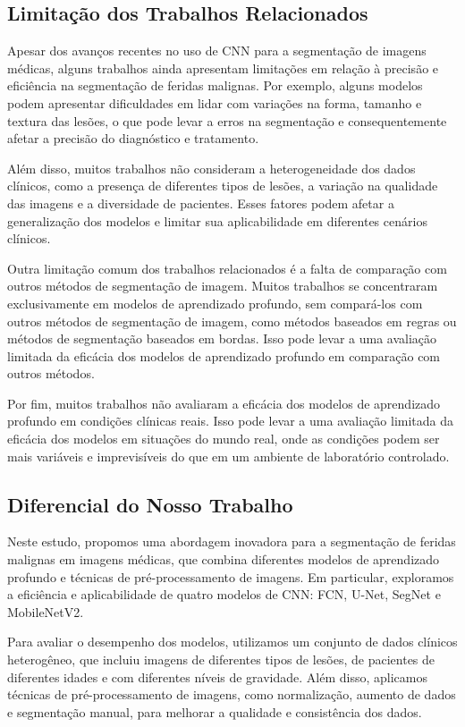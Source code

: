 \subsection{Limitação dos Trabalhos Relacionados}

Apesar dos avanços recentes no uso de \ac{CNN} para a segmentação de imagens médicas, alguns trabalhos ainda apresentam limitações em relação à precisão e eficiência na segmentação de feridas malignas. Por exemplo, alguns modelos podem apresentar dificuldades em lidar com variações na forma, tamanho e textura das lesões, o que pode levar a erros na segmentação e consequentemente afetar a precisão do diagnóstico e tratamento.

Além disso, muitos trabalhos não consideram a heterogeneidade dos dados clínicos, como a presença de diferentes tipos de lesões, a variação na qualidade das imagens e a diversidade de pacientes. Esses fatores podem afetar a generalização dos modelos e limitar sua aplicabilidade em diferentes cenários clínicos.

Outra limitação comum dos trabalhos relacionados é a falta de comparação com outros métodos de segmentação de imagem. Muitos trabalhos se concentraram exclusivamente em modelos de aprendizado profundo, sem compará-los com outros métodos de segmentação de imagem, como métodos baseados em regras ou métodos de segmentação baseados em bordas. Isso pode levar a uma avaliação limitada da eficácia dos modelos de aprendizado profundo em comparação com outros métodos.

Por fim, muitos trabalhos não avaliaram a eficácia dos modelos de aprendizado profundo em condições clínicas reais. Isso pode levar a uma avaliação limitada da eficácia dos modelos em situações do mundo real, onde as condições podem ser mais variáveis e imprevisíveis do que em um ambiente de laboratório controlado.


\subsection{Diferencial do Nosso Trabalho }

Neste estudo, propomos uma abordagem inovadora para a segmentação de feridas malignas em imagens médicas, que combina diferentes modelos de aprendizado profundo e técnicas de pré-processamento de imagens. Em particular, exploramos a eficiência e aplicabilidade de quatro modelos de \ac{CNN}: \ac{FCN}, \ac{U-Net}, \ac{SegNet} e \ac{MobileNetV2}.

Para avaliar o desempenho dos modelos, utilizamos um conjunto de dados clínicos heterogêneo, que incluiu imagens de diferentes tipos de lesões, de pacientes de diferentes idades e com diferentes níveis de gravidade. Além disso, aplicamos técnicas de pré-processamento de imagens, como normalização, aumento de dados e segmentação manual, para melhorar a qualidade e consistência dos dados.

